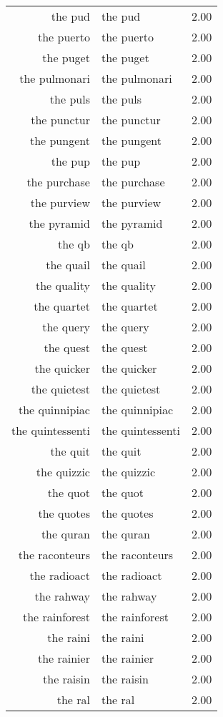 \begin{table}[ht]
\begin{tabular}{rlr}
  the pud & the pud & 2.00 \\ 
  the puerto & the puerto & 2.00 \\ 
  the puget & the puget & 2.00 \\ 
  the pulmonari & the pulmonari & 2.00 \\ 
  the puls & the puls & 2.00 \\ 
  the punctur & the punctur & 2.00 \\ 
  the pungent & the pungent & 2.00 \\ 
  the pup & the pup & 2.00 \\ 
  the purchase & the purchase & 2.00 \\ 
  the purview & the purview & 2.00 \\ 
  the pyramid & the pyramid & 2.00 \\ 
  the qb & the qb & 2.00 \\ 
  the quail & the quail & 2.00 \\ 
  the quality & the quality & 2.00 \\ 
  the quartet & the quartet & 2.00 \\ 
  the query & the query & 2.00 \\ 
  the quest & the quest & 2.00 \\ 
  the quicker & the quicker & 2.00 \\ 
  the quietest & the quietest & 2.00 \\ 
  the quinnipiac & the quinnipiac & 2.00 \\ 
  the quintessenti & the quintessenti & 2.00 \\ 
  the quit & the quit & 2.00 \\ 
  the quizzic & the quizzic & 2.00 \\ 
  the quot & the quot & 2.00 \\ 
  the quotes & the quotes & 2.00 \\ 
  the quran & the quran & 2.00 \\ 
  the raconteurs & the raconteurs & 2.00 \\ 
  the radioact & the radioact & 2.00 \\ 
  the rahway & the rahway & 2.00 \\ 
  the rainforest & the rainforest & 2.00 \\ 
  the raini & the raini & 2.00 \\ 
  the rainier & the rainier & 2.00 \\ 
  the raisin & the raisin & 2.00 \\ 
  the ral & the ral & 2.00 \\ 

\end{tabular}
\end{table}
